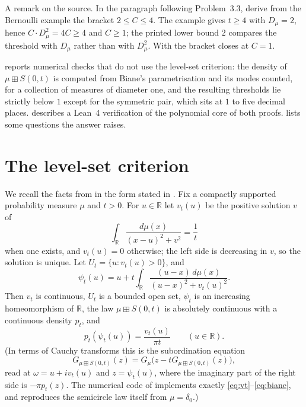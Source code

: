 \documentclass[11pt]{amsart}
\theoremstyle{definition}
\newcommand{\R}{\mathbb{R}}
\newcommand{\bp}{\boxplus}
\begin{document}
A remark on the source. In the paragraph following Problem~3.3, \cite{HasebeUeda} derive from the Bernoulli example the bracket $2\le C\le 4$. The example gives $t\ge 4$ with $D_\mu=2$, hence $C\cdot D_\mu^2=4C\ge 4$ and $C\ge 1$; the printed lower bound $2$ compares the threshold with $D_\mu$ rather than with $D_\mu^2$. With  the bracket closes at $C=1$.

 reports numerical checks that do not use the level-set criterion: the density of $\mu\bp S(0,t)$ is computed from Biane's parametrisation and its modes counted, for a collection of measures of diameter one, and the resulting thresholds lie strictly below $1$ except for the symmetric pair, which sits at $1$ to five decimal places.  describes a Lean~4 verification of the polynomial core of both proofs.  lists some questions the answer raises.

\section{The level-set criterion}\label{sec:criterion}

We recall the facts from \cite{Biane97} in the form stated in \cite[Section 2.2]{HasebeUeda}. Fix a compactly supported probability measure $\mu$ and $t>0$. For $u\in\R$ let $v_t(u)$ be the positive solution $v$ of
\begin{equation}\label{eq:vt}
\int_\R\frac{d\mu(x)}{(x-u)^2+v^2}=\frac1t
\end{equation}
when one exists, and $v_t(u)=0$ otherwise; the left side is decreasing in $v$, so the solution is unique. Let $U_t=\{u: v_t(u)>0\}$, and
\begin{equation}\label{eq:psi}
\psi_t(u)=u+t\int_\R\frac{(u-x)\,d\mu(x)}{(u-x)^2+v_t(u)^2}.
\end{equation}
Then $v_t$ is continuous, $U_t$ is a bounded open set, $\psi_t$ is an increasing homeomorphism of $\R$, the law $\mu\bp S(0,t)$ is absolutely continuous with a continuous density $p_t$, and
\begin{equation}\label{eq:biane}
p_t(\psi_t(u))=\frac{v_t(u)}{\pi t}\qquad(u\in\R).
\end{equation}
(In terms of Cauchy transforms this is the subordination equation
\[
G_{\mu\bp S(0,t)}(z)=G_\mu\big(z-tG_{\mu\bp S(0,t)}(z)\big),
\]
read at $\omega=u+iv_t(u)$ and $z=\psi_t(u)$, where the imaginary part of the right side is $-\pi p_t(z)$. The numerical code of  implements exactly \eqref{eq:vt}--\eqref{eq:biane}, and reproduces the semicircle law itself from $\mu=\delta_0$.)
\end{document}
